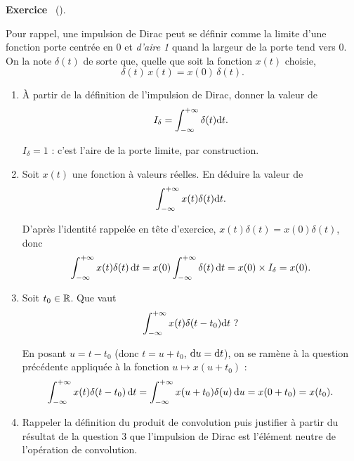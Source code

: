 \documentclass[a4paper,11pt]{article}
\theoremstyle{definition}
\newcounter{exercice}   %
\newenvironment{exercice}[1][]{%
  \refstepcounter{exercice}%
  \par\noindent\textbf{Exercice \theexercice}\if\relax\detokenize{#1}\relax\else\ (#1)\fi.\par\noindent\ignorespaces
}{\par}
\newcommand{\highlight}[1]{{\color{niceblue}\emph{#1}}}
\begin{document}
\begin{exercice}
    Pour rappel, une impulsion de Dirac peut se définir comme la limite d'une fonction porte centrée en 0 et \highlight{d'aire 1} quand la largeur de la porte tend vers 0. On la note $\delta(t)$ de sorte que, quelle que soit la fonction $x(t)$ choisie,
    $$
        \delta(t)\,x(t) = x(0)\,\delta(t).
    $$

    \begin{enumerate}[\bfseries 1.]
        \item À partir de la définition de l'impulsion de Dirac, donner la valeur de $$I_\delta = \int_{-\infty}^{+\infty} \delta(t) {\rm d} t.$$
        \begin{solution}
            $I_\delta = 1$ : c'est l'aire de la porte limite, par construction.
        \end{solution}
        \item Soit $x(t)$ une fonction à valeurs réelles. En déduire la valeur de $$\int_{-\infty}^{+\infty} x(t)\delta(t){\rm d} t.$$
        \begin{solution}
            D'après l'identité rappelée en tête d'exercice, $x(t)\delta(t)=x(0)\delta(t)$, donc
            $$
                \int_{-\infty}^{+\infty} x(t)\delta(t)\,{\rm d} t = x(0)\int_{-\infty}^{+\infty}\delta(t)\,{\rm d} t = x(0)\times I_\delta = x(0).
            $$
        \end{solution}
        \item Soit $t_0 \in{\mathbb{R}}$. Que vaut
         $$\int_{-\infty}^{+\infty} x(t)\delta(t-t_0)\d t\ ?$$
        \begin{solution}
            En posant $u=t-t_0$ (donc $t=u+t_0$, ${\rm d} u={\rm d} t$), on se ramène à la question précédente appliquée à la fonction $u\mapsto x(u+t_0)$ :
            $$
                \int_{-\infty}^{+\infty} x(t)\delta(t-t_0)\,{\rm d} t = \int_{-\infty}^{+\infty} x(u+t_0)\delta(u)\,{\rm d} u = x(0+t_0) = x(t_0).
            $$
        \end{solution}
        \item Rappeler la définition du produit de convolution puis justifier à partir du résultat de la question 3 que l'impulsion de Dirac est l'élément neutre de l'opération de convolution.


\end{enumerate}
\end{exercice}
\end{document}
